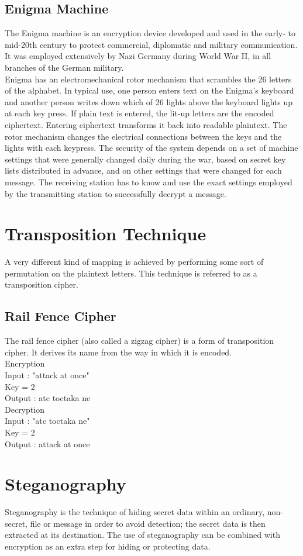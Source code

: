 \documentclass{article}
\begin{document}
\subsection{Enigma Machine}
The Enigma machine is an encryption device developed and used in the early- to mid-20th century to protect commercial, diplomatic and military communication. It was employed extensively by Nazi Germany during World War II, in all branches of the German military.\\
Enigma has an electromechanical rotor mechanism that scrambles the 26 letters of the alphabet. In typical use, one person enters text on the Enigma's keyboard and another person writes down which of 26 lights above the keyboard lights up at each key press. If plain text is entered, the lit-up letters are the encoded ciphertext. Entering ciphertext transforms it back into readable plaintext. The rotor mechanism changes the electrical connections between the keys and the lights with each keypress. The security of the system depends on a set of machine settings that were generally changed daily during the war, based on secret key lists distributed in advance, and on other settings that were changed for each message. The receiving station has to know and use the exact settings employed by the transmitting station to successfully decrypt a message.
\section{Transposition Technique}
A very different kind of mapping is achieved by performing
some sort of permutation on the plaintext letters. This technique is referred to as a
transposition cipher.
\subsection{Rail Fence Cipher}
The rail fence cipher (also called a zigzag cipher) is a form of transposition cipher.
It derives its name from the way in which it is encoded.\\
Encryption\\
Input : "attack at once"\\
Key = 2 \\
Output : atc toctaka ne \\
Decryption\\
Input : "atc toctaka ne"\\
Key = 2\\
Output : attack at once\\
\section{Steganography}
Steganography is the technique of hiding secret data within an ordinary, non-secret, file or message in order to avoid detection; the secret data is then extracted at its destination. The use of steganography can be combined with encryption as an extra step for hiding or protecting data.
\end{document}
